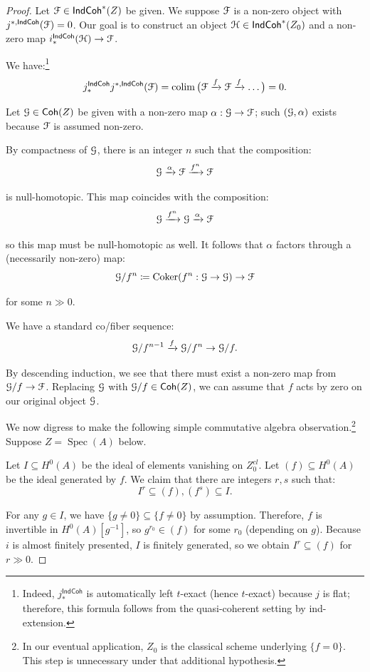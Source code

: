 \documentclass[reqno,11pt]{amsart}
\numberwithin{equation}{subsection}
\theoremstyle{remark}
\newcommand{\xar}[1]{\xrightarrow{#1}}
\newcommand{\sF}{{\EuScript F}}
\newcommand{\sG}{{\EuScript G}}
\newcommand{\sH}{{\EuScript H}}
\newcommand{\on}{\operatorname}
\newcommand{\Coker}{\on{Coker}}
\newcommand{\Spec}{\on{Spec}}
\newcommand{\colim}{\on{colim}}
\newcommand{\Coh}{\mathsf{Coh}}
\newcommand{\IndCoh}{\mathsf{IndCoh}}
\renewcommand{\subset}{\subseteq}
\begin{document}
\begin{proof}

Let $\sF \in \IndCoh^*(Z)$ be given. We suppose $\sF$ is a non-zero
object with $j^{*,\IndCoh}(\sF) = 0$. Our goal is to construct 
an object $\sH \in \IndCoh^*(Z_0)$ and a non-zero map 
$i_*^{\IndCoh}(\sH) \to \sF$. 

\step We have:\footnote{Indeed, $j_*^{\IndCoh}$ is automatically left $t$-exact
(hence $t$-exact) because $j$ is flat; therefore, this formula follows from
the quasi-coherent setting by ind-extension.}
%
\[
j_*^{\IndCoh}j^{*,\IndCoh}(\sF) = \colim \big(\sF \xar{f} \sF \xar{f} \ldots \big) = 
0.
\]

Let $\sG \in \Coh(Z)$ be given with a non-zero map $\alpha:\sG \to \sF$; such 
$(\sG,\alpha)$
exists because $\sF$ is assumed non-zero. 

By compactness of $\sG$, there is an integer $n$ such that the composition:
%
\[
\sG \xar{\alpha} \sF \xar{f^n} \sF
\]

\noindent is null-homotopic. This map coincides with the composition:
%
\[
\sG \xar{f^n} \sG \xar{\alpha} \sF
\]

\noindent so this map must be null-homotopic as well. 
It follows that $\alpha$ factors through a (necessarily non-zero) map: 
%
\[
\sG/f^n\coloneqq \Coker(f^n:\sG \to \sG) \to \sF
\]

\noindent for some $n \gg 0$.

We have a standard co/fiber sequence:
%
\[
\sG/{f^{n-1}} \xar{f} \sG/f^n \to \sG/f.
\]

\noindent By descending induction, we see that there must exist
a non-zero map from $\sG/f \to \sF$. Replacing $\sG$ with $\sG/f \in \Coh(Z)$, 
we can assume that $f$ acts by zero on our original object $\sG$.

\step We now digress to make the following simple commutative algebra 
observation.\footnote{In our eventual application, $Z_0$ is the classical
scheme underlying $\{f=0\}$. This step is unnecessary under that
additional hypothesis.}
Suppose $Z = \Spec(A)$ below.

Let $I \subset H^0(A)$ be the ideal of 
elements vanishing on $Z_0^{cl}$. Let $(f) \subset H^0(A)$ 
be the ideal generated by $f$. We claim that there are integers $r,s$
such that:
%
\[
I^r \subset (f), (f^s) \subset I. 
\]

For any $g \in I$, we have $\{g \neq 0\} \subset \{f \neq 0\}$ by assumption. 
Therefore, $f$ is invertible in $H^0(A)[g^{-1}]$, so $g^{r_0} \in (f)$ for some
$r_0$ (depending on $g$). 
Because $i$ is almost finitely presented, $I$ is finitely generated,
so we obtain $I^r \subset (f)$ for $r \gg 0$.


\end{proof}
\end{document}
